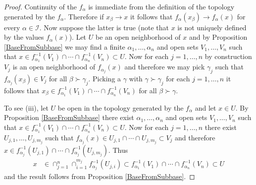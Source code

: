 \begin{proof}
Continuity of the $f_\alpha$ is immediate from the definition of the topology generated by the $f_\alpha$.  Therefore if $x_\beta \to x$ it follows that $f_\alpha(x_\beta) \to f_\alpha(x)$ for every $\alpha \in \mathcal{I}$.  Now suppose the latter is true (note that $x$ is not uniquely defined by the values $f_\alpha(x)$).  Let $U$ be an open neighborhood of $x$ and by Proposition \ref{BaseFromSubbase} we may find a finite $\alpha_1, \dotsc, \alpha_n$ and open sets $V_1, \dotsc, V_n$ such that $x \in f_{\alpha_1}^{-1}(V_1) \cap \dotsb \cap f_{\alpha_n}^{-1}(V_n) \subset U$.  Now for each $j=1, \dotsc, n$ by
construction $V_j$ is an open neighborhood of $f_{\alpha_j}(x)$ and therefore we may pick $\gamma_j$ such that $f_{\alpha_j}(x_\beta) \in V_j$ for all $\beta \succ \gamma_j$.  Picking a $\gamma$ with
$\gamma \succ \gamma_j$ for each $j=1, \dotsc, n$ it follows that $x_\beta \in f_{\alpha_1}^{-1}(V_1) \cap \dotsb \cap f_{\alpha_n}^{-1}(V_n)$ for all $\beta \succ \gamma$.

To see (iii), let $U$ be open in the topology generated by the $f_\alpha$ and let $x \in U$.  By Proposition \ref{BaseFromSubbase} there exist $\alpha_1, \dotsc, \alpha_n$ and open sets $V_1, \dotsc, V_n$ such that $x \in f_{\alpha_1}^{-1}(V_1) \cap \dotsb \cap f_{\alpha_n}^{-1}(V_n) \subset U$.  Now for each $j=1, \dotsc, n$ there exist $U_{j,1}, \dotsc, U_{j, m_j}$ such that $f_{\alpha_j}(x) \in U_{j,1} \cap \dotsb \cap U_{j, m_j} \subset V_j$ and therefore $x \in f_{\alpha_j}^{-1}(U_{j, 1}) \cap \dotsb \cap  f_{\alpha_j}^{-1}(U_{j, m_j})$.  Thus 
\begin{align*}
x &\in \cap_{j=1}^n \cap_{i=1}^{m_j}  f_{\alpha_j}^{-1}(U_{j, i}) \subset f_{\alpha_1}^{-1}(V_1) \cap \dotsb \cap f_{\alpha_n}^{-1}(V_n) \subset U
\end{align*} 
and the result follows from Proposition \ref{BaseFromSubbase}.
\end{proof}

